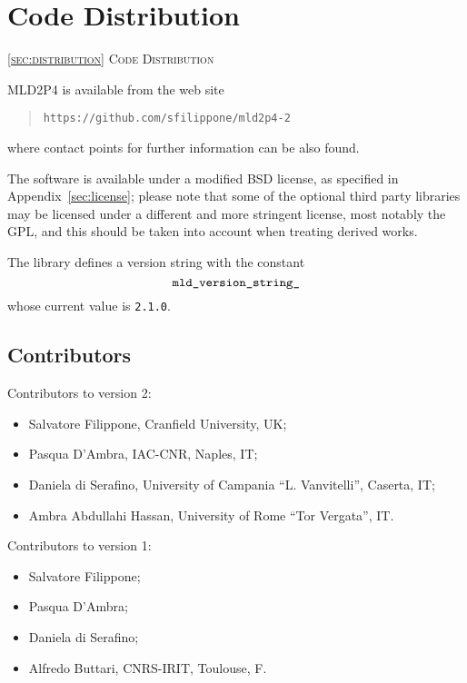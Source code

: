 \section{Code Distribution\label{sec:distribution}}
         {\textsc{\ref{sec:distribution} Code Distribution}}

\noindent
MLD2P4 is available from the web site 
\begin{quotation}
\texttt{https://github.com/sfilippone/mld2p4-2}
\end{quotation}
where contact points for further information can be also found.

The software is available under a modified BSD license, as specified
in Appendix~\ref{sec:license}; please note that some of the optional
third party libraries may be licensed under a different and more
stringent license, most notably the GPL, and this should be taken into
account when treating derived works. 

The library defines a version string with the
constant 
\[ \verb|mld_version_string_|\]
whose current value is \verb|2.1.0|.

\subsection*{Contributors}
Contributors to version 2:
\begin{itemize}
\item Salvatore  Filippone,          Cranfield University, UK;				
\item Pasqua     D'Ambra,            IAC-CNR, Naples, IT;				
\item Daniela    di Serafino,        University of Campania ``L. Vanvitelli'', Caserta, IT;
\item Ambra	 Abdullahi Hassan, University of Rome ``Tor Vergata'', IT.
\end{itemize}
Contributors to version 1:
\begin{itemize}
\item Salvatore  Filippone;
\item Pasqua     D'Ambra;
\item Daniela    di Serafino;
\item Alfredo    Buttari, CNRS-IRIT, Toulouse, F. 
\end{itemize}
